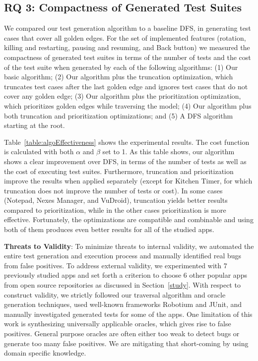 \subsection{RQ 3: Compactness of Generated Test Suites}
We compared our test generation algorithm to a baseline DFS, in generating test cases that cover all golden edges. For the set of implemented features (rotation, killing and restarting, pausing and resuming, and Back button) we measured the compactness of generated test suites in terms of the number of tests and the cost of the test suite when generated by each of the following algorithms:
(1) Our basic algorithm;
(2) Our algorithm plus the truncation optimization, which truncates test cases after the last golden edge and ignores test cases that do not cover any golden edge;
(3) Our algorithm plus the prioritization optimization, which prioritizes golden edges while traversing the model;
(4) Our algorithm plus both truncation and prioritization optimizations; and
(5) A DFS algorithm starting at the root.

Table~\ref{table:algoEffectiveness} shows the experimental results. The cost function is calculated with both $\alpha$ and $\beta$ set to 1. As this table shows, our algorithm shows a clear improvement over DFS, in terms of the number of tests as well as the cost of executing test suites. Furthermore, truncation and prioritization improve the results when applied separately (except for Kitchen Timer, for which truncation does not improve the number of tests or cost). In some cases (Notepad, Nexes Manager, and VuDroid), truncation yields better results compared to prioritization, while in the other cases prioritization is more effective. Fortunately, the optimizations are compatible and combinable and using both of them produces even better results for all of the studied apps.



{\bf Threats to Validity}: To minimize threats to internal validity, we automated the entire test generation and execution process and manually identified real bugs from false positives. To address external validity, we experimented with 7 previously studied apps and set forth a criterion to choose 6 other popular apps from open source repositories as discussed in Section~\ref{study}. With respect to construct validity, we strictly followed our traversal algorithm and oracle generation techniques, used well-known frameworks Robotium and JUnit, and manually investigated generated tests for some of the apps. 
One limitation of this work is synthesizing universally applicable oracles, which gives rise to false positives.
General purpose oracles are often either too weak to detect bugs or generate too many false positives. We are mitigating that short-coming by using domain specific knowledge. 

